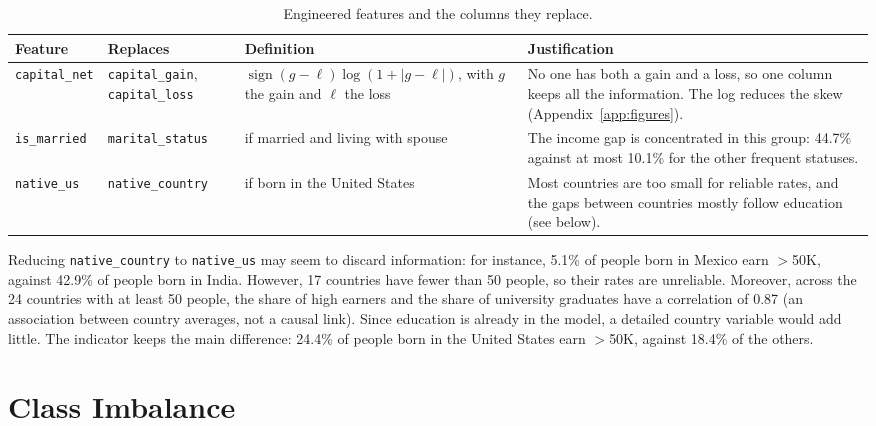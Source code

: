 \documentclass[10pt,a4paper]{article}
\newcommand{\high}{$>$50K}
\begin{document}
\begin{table}[htbp]
\centering
\caption{Engineered features and the columns they replace.}
\label{tab:features}
\small
\begin{tabular}{>{\raggedright\arraybackslash}p{2.0cm}>{\raggedright\arraybackslash}p{2.6cm}>{\raggedright\arraybackslash}p{3.5cm}>{\raggedright\arraybackslash}p{5.9cm}}
\toprule
Feature & Replaces & Definition & Justification \\
\midrule
\texttt{capital\_net} & \texttt{capital\_gain}, \texttt{capital\_loss} &
$\operatorname{sign}(g-\ell)\log(1+|g-\ell|)$, with $g$ the gain and $\ell$ the loss &
No one has both a gain and a loss, so one column keeps all the information. The log
reduces the skew (Appendix~\ref{app:figures}). \\
\addlinespace
\texttt{is\_married} & \texttt{marital\_status} & 1 if married and living with spouse &
The income gap is concentrated in this group: 44.7\% against at most 10.1\% for the
other frequent statuses. \\
\addlinespace
\texttt{native\_us} & \texttt{native\_country} & 1 if born in the United States &
Most countries are too small for reliable rates, and the gaps between countries mostly
follow education (see below). \\
\bottomrule
\end{tabular}
\end{table}

Reducing \texttt{native\_country} to \texttt{native\_us} may seem to discard
information: for instance, 5.1\% of people born in Mexico earn \high{}, against 42.9\% of
people born in India. However, 17 countries have fewer than 50 people, so their rates are
unreliable. Moreover, across the 24 countries with at least 50 people, the share of high
earners and the share of university graduates have a correlation of 0.87 (an
association between country averages, not a causal link). Since education is already in
the model, a detailed country variable would add little. The indicator keeps the main
difference: 24.4\% of people born in the United States earn \high{}, against 18.4\% of
the others.

\section{Class Imbalance}
\label{sec:imbalance}
\end{document}
